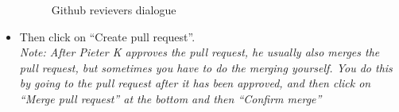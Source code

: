\begin{itemize}
\begin{figure}[H]
	\caption{Github revievers dialogue }
	\label{fig:reviewers}
\end{figure}
\item Then click on “Create pull request”.\\
\textit{ Note: After Pieter K approves the pull request, he usually also merges
the pull request, but sometimes you have to do the merging yourself.
You do this by going to the pull request after it has been approved,
and then click on “Merge pull request” at the bottom and then “Confirm
merge”}
\end{itemize}






	